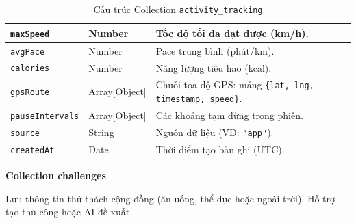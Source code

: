 \begin{table}[H]
\begin{tabularx}{\textwidth}{|p{3.6cm}|p{2.6cm}|X|}
\texttt{maxSpeed}       & Number        & Tốc độ tối đa đạt được (km/h). \\ \hline
\rowcolor{dbrowalt}
\texttt{avgPace}        & Number        & Pace trung bình (phút/km). \\ \hline
\texttt{calories}       & Number        & Năng lượng tiêu hao (kcal). \\ \hline
\rowcolor{dbrowalt}
\texttt{gpsRoute}       & Array[Object] & Chuỗi tọa độ GPS: mảng \texttt{\{lat, lng, timestamp, speed\}}. \\ \hline
\texttt{pauseIntervals} & Array[Object] & Các khoảng tạm dừng trong phiên. \\ \hline
\rowcolor{dbrowalt}
\texttt{source}         & String        & Nguồn dữ liệu (VD: \texttt{"app"}). \\ \hline
\texttt{createdAt}      & Date          & Thời điểm tạo bản ghi (UTC). \\ \hline
\end{tabularx}
\caption{Cấu trúc Collection \texttt{activity\_tracking}}
\label{tab:col_activity_tracking}
\end{table}

\textbf{Collection challenges}
\label{subsec:col_challenges}

Lưu thông tin thử thách cộng đồng (ăn uống, thể dục hoặc ngoài trời). Hỗ trợ tạo thủ công hoặc AI đề xuất.

